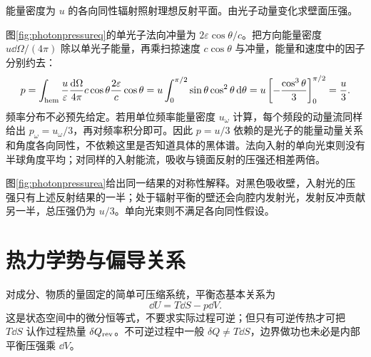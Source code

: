 \begin{example}[辐射压强]\label{ex:photonpressure}
能量密度为 $u$ 的各向同性辐射照射理想反射平面。由光子动量变化求壁面压强。
\end{example}
\begin{solution}
图\ref{fig:photonpressureq}的单光子法向冲量为 $2\varepsilon\cos\theta/c$。把方向能量密度 $u\dd\Omega/(4\pi)$ 除以单光子能量，再乘扫掠速度 $c\cos\theta$ 与冲量，能量和速度中的因子分别约去：
\[
 p=\int_{\rm hem}\frac u\varepsilon\frac{\mathop{}\!\mathrm d\Omega}{4\pi}
 c\cos\theta\frac{2\varepsilon}c\cos\theta
 =u\int_0^{\pi/2}\sin\theta\cos^2\theta\mathop{}\!\mathrm d\theta
 =u\left[-\frac{\cos^3\theta}{3}\right]_0^{\pi/2}=\frac u3.
\]
频率分布不必预先给定。若用单位频率能量密度 $u_\omega$ 计算，每个频段的动量流同样给出 $p_\omega=u_\omega/3$，再对频率积分即可。因此 $p=u/3$ 依赖的是光子的能量动量关系和角度各向同性，不依赖这里是否知道具体的黑体谱。法向入射的单向光束则没有半球角度平均；对同样的入射能流，吸收与镜面反射的压强还相差两倍。

图\ref{fig:photonpressurea}给出同一结果的对称性解释。对黑色吸收壁，入射光的压强只有上述反射结果的一半；处于辐射平衡的壁还会向腔内发射光，发射反冲贡献另一半，总压强仍为 $u/3$。单向光束则不满足各向同性假设。
\end{solution}

\section{热力学势与偏导关系}
\label{th:potentials}
对成分、物质的量固定的简单可压缩系统，平衡态基本关系为
\begin{equation}\label{eq:fundamental}
 \dd U=T\dd S-p\dd V.
\end{equation}
这是状态空间中的微分恒等式，不要求实际过程可逆；但只有可逆传热才可把 $T\dd S$ 认作过程热量 $\delta Q_{\rm rev}$。不可逆过程中一般 $\delta Q\ne T\dd S$，边界做功也未必是内部平衡压强乘 $\dd V$。

